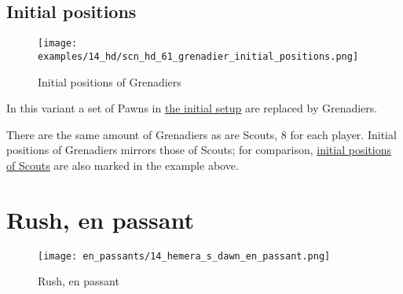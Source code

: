 \clearpage %

\subsection*{Initial positions}
\label{sec:Hemera's Dawn/Grenadier/Initial positions}

\vspace*{-1.2\baselineskip}
\noindent
\begin{figure}[!h]
\texttt{[image: examples/14\_hd/scn\_hd\_61\_grenadier\_initial\_positions.png]}
\vspace*{-1.3\baselineskip}
\caption{Initial positions of Grenadiers}
\label{fig:scn_hd_61_grenadier_initial_positions}
\end{figure}

\vspace*{-0.5\baselineskip}
In this variant a set of Pawns in
\hyperref[fig:14_hemera_s_dawn]{the initial setup} are replaced by Grenadiers.

There are the same amount of Grenadiers as are Scouts, 8 for each player.
Initial positions of Grenadiers mirrors those of Scouts; for comparison,
\hyperref[fig:scn_hd_39_scout_initial_positions]{initial positions of Scouts}
are also marked in the example above.

\clearpage %

\section*{Rush, en passant}
\label{sec:Hemera's Dawn/Rush, en passant}

\vspace*{-2.3\baselineskip}
\noindent
\begin{figure}[!h]
\texttt{[image: en\_passants/14\_hemera\_s\_dawn\_en\_passant.png]}
\vspace*{-1.3\baselineskip}
\caption{Rush, en passant}
\label{fig:14_hemera_s_dawn_en_passant}
\end{figure}

